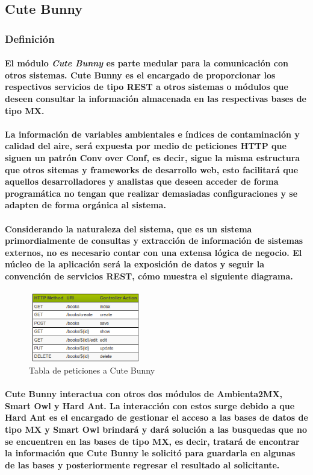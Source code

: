   \subsection{Cute Bunny}
    \subsubsection{Definición}
     \paragraph{El módulo \textbf{\emph{Cute Bunny}} es parte medular para la comunicación con otros sistemas. Cute Bunny es el encargado de proporcionar los respectivos servicios de tipo REST a otros sistemas o módulos que deseen consultar la información almacenada en las respectivas bases de tipo MX.}
     \paragraph{La información de variables ambientales e índices de contaminación y calidad del aire, será expuesta por medio de peticiones HTTP que siguen un patrón Conv over Conf, es decir, sigue la misma estructura que otros sitemas y frameworks de desarrollo web, esto facilitará que aquellos desarrolladores y analistas que deseen acceder de forma programática no tengan que realizar demasiadas configuraciones y se adapten de forma orgánica al sistema.}
     \paragraph{Considerando la naturaleza del sistema, que es un sistema primordialmente de consultas y extracción de información de sistemas externos, no es necesario contar con una extensa lógica de negocio. El núcleo de la aplicación será la exposición de datos y seguir la convención de servicios REST, cómo muestra el siguiente diagrama.}
      \begin{figure}[h!]
        \centering
        \includegraphics[width=5cm,height=3cm]{./images/DiagramaREST.png}
        \caption{Tabla de peticiones a Cute Bunny}
     \end{figure}
  \paragraph{Cute Bunny interactua con otros dos módulos de Ambienta2MX, Smart Owl y Hard Ant. La interacción con estos surge debido a que Hard Ant es el encargado de gestionar el acceso a las bases de datos de tipo MX y Smart Owl brindará y dará solución a las busquedas que no se encuentren en las bases de tipo MX, es decir, tratará de encontrar la información que Cute Bunny le solicitó para guardarla en algunas de las bases y posteriormente regresar el resultado al solicitante.}
